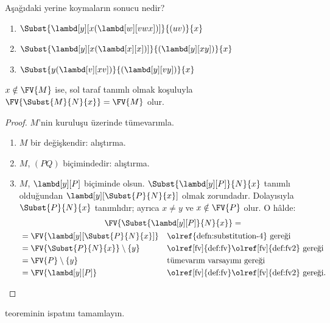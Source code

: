 \begin{prob}
  Aşağıdaki yerine koymaların sonucu nedir?
  \begin{enumerate}
  \item $\Subst{\lambd[y][x(\lambd[w][vwx])]}{(uv)}{x}$
  \item $\Subst{\lambd[y][x(\lambd[x][x])]}{(\lambd[y][xy])}{x}$
  \item $\Subst{y(\lambd[v][xv])}{(\lambd[y][vy])}{x}$
  \end{enumerate}
\end{prob}

\begin{thm} 
  $x \notin \FV{M}$ ise, sol taraf tanımlı olmak koşuluyla
  $\FV{\Subst{M}{N}{x}} = \FV{M}$ olur.
\end{thm}

\begin{proof}
  $M$'nin kuruluşu üzerinde tümevarımla.
  \begin{enumerate}
  \item $M$ bir değişkendir: alıştırma.
  \item $M$, $(PQ)$ biçimindedir: alıştırma.
  \item $M$, $\lambd[y][P]$ biçiminde olsun. 
    $\Subst{\lambd[y][P]}{N}{x}$ tanımlı olduğundan
    $\lambd[y][\Subst{P}{N}{x}]$ olmak zorundadır. Dolayısıyla
    $\Subst{P}{N}{x}$ tanımlıdır; ayrıca $x\neq y$ ve
    $x\notin\FV{P}$ olur. O hâlde:
    \begin{multline*}
      \FV{\Subst{\lambd[y][P]}{N}{x}} = \\
    \begin{aligned}
      & = \FV{\lambd[y][\Subst{P}{N}{x}]} &&
      \text{\olref{defn:substitution-4} gereği}\\
      & = \FV{\Subst{P}{N}{x}} \setminus \{y\} &&
      \text{\olref[fv]{def:fv}\olref[fv]{def:fv2} gereği}\\
      & = \FV{P} \setminus \{y\} && \text{tümevarım varsayımı gereği} \\
      & = \FV{\lambd[y][P]} &&
      \text{\olref[fv]{def:fv}\olref[fv]{def:fv2} gereği.}
    \end{aligned}
    \end{multline*}
  \end{enumerate}
\end{proof}

\begin{prob}
   teoreminin ispatını tamamlayın.
\end{prob}


